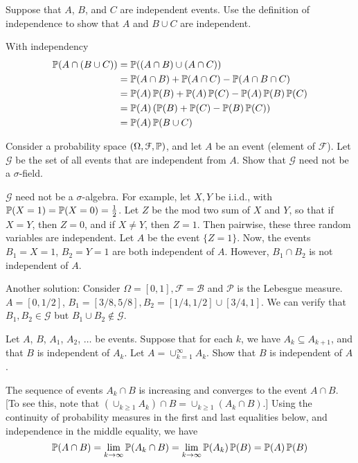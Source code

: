 \documentclass[a4paper, 12pt, answers]{exam}
\newcommand{\FF}{\mathcal{F}}
\newcommand{\rai}{\rightarrow \infty}
\begin{document}
\begin{questions}
\question Suppose that $A$, $B$, and $C$ are independent events. Use the definition of independence to show that $A$ and $B \cup C$ are independent.
\begin{solution}
	With independency
	\begin{equation*}
	\begin{aligned}
	\operatorname{\mathbb{P}}(A\cap(B\cup C))&=\operatorname{\mathbb{P}}((A\cap B)\cup(A\cap C))\\
	&=\operatorname{\mathbb{P}}(A\cap B)+\operatorname{\mathbb{P}}(A\cap C)-\operatorname{\mathbb{P}}(A\cap B\cap C)\\
	&=\operatorname{\mathbb{P}}(A)\operatorname{\mathbb{P}}(B)+\operatorname{\mathbb{P}}(A)\operatorname{\mathbb{P}}(C)-\operatorname{\mathbb{P}}(A)\operatorname{\mathbb{P}}(B)\operatorname{\mathbb{P}}(C)\\
	&=\operatorname{\mathbb{P}}(A)\left(\operatorname{\mathbb{P}}(B)+\operatorname{\mathbb{P}}(C)-\operatorname{\mathbb{P}}(B)\operatorname{\mathbb{P}}(C)\right)\\
	&=\operatorname{\mathbb{P}}(A)\operatorname{\mathbb{P}}(B\cup C)
	\end{aligned}
	\end{equation*}
\end{solution}


\question Consider a probability space $(\Omega, \FF, \Prob)$, and let $A$ be an event (element of $\FF$). Let $\mathcal{G}$ be the set of all events that are independent from $A$. Show that $\mathcal{G}$ need not be a $\sigma$-field.
\begin{solution}
	$\mathcal{G}$ need not be a $\sigma$-algebra.
	For example, let $X, Y$ be i.i.d., with $\operatorname{\mathbb{P}}(X=1)=\operatorname{\mathbb{P}}(X=0)=\frac 12$. Let $Z$ be the mod two sum of $X$ and $Y$,
	so that if $X=Y$, then $Z=0$, and if $X\ne Y$, then $Z=1$. Then pairwise, these three random variables are independent. Let $A$ be the event $\{Z=1\}$. Now, the events $B_1={X =1}$, $B_2={Y=1}$ are both independent of $A$. However, $B_1 \cap B_2$ is not independent of $A$.

	Another solution: Consider $\Omega=[0,1], \mathcal{F}
	=\mathcal{B}$ and $\mathcal{P}$ is the Lebesgue measure.
	$A=[0,1/2]$, $B_1=[3/8,5/8],B_2=[1/4,1/2]\cup [3/4,1]$.
	We can verify that $B_1,B_2 \in \mathcal{G}$ but
	$B_1\cup B_2 \not\in \mathcal{G}$.
\end{solution}
\question Let $A$, $B$, $A_1$, $A_2$, $\dots$ be events. Suppose that for each $k$, we have $A_k \subseteq A_{k+1}$, and that $B$ is independent of $A_k$. Let $A = \cup_{k=1}^{\infty}A_k$. Show that $B$ is independent of $A$.
\begin{solution}
	The sequence of events $A_k \cap B$ is increasing and converges to the event $A \cap B$. [To see this, note that $(\cup_{k\ge1}A_k)\cap B =\cup_{k\ge 1} (A_k \cap B)$.] Using the continuity of probability measures in the first and last equalities below, and independence in the middle equality, we have
	\begin{equation*}
	\Prob(A \cap B)= \lim\limits_{k\rai} \Prob(A_k \cap B)= \lim\limits_{k\rai} \Prob(A_k)\Prob(B)=\Prob(A)\Prob(B)
	\end{equation*}
	\end{solution}
\end{questions}  
\end{document}
